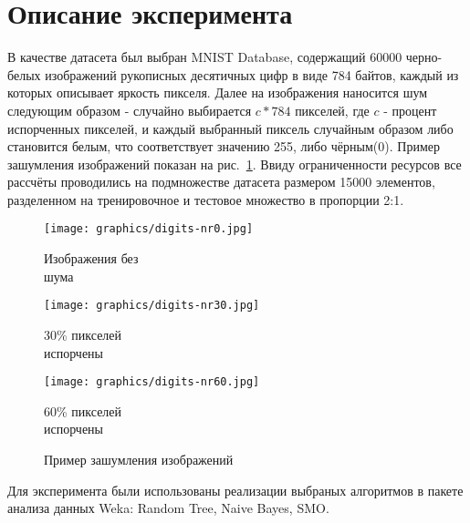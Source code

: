 \documentclass{article}
\begin{document}
\section{Описание эксперимента}
В качестве датасета был выбран MNIST Database\cite{quanpt:mnistlecun}, содержащий 60000 черно-белых изображений рукописных десятичных цифр в виде 784 байтов, каждый из которых описывает яркость пикселя. Далее на изображения наносится шум следующим образом - случайно выбирается $c * 784$ пикселей, где $c$ - процент испорченных пикселей, и каждый выбранный пиксель случайным образом либо становится белым, что соответствует значению 255, либо чёрным(0). Пример зашумления изображений показан на рис.~\ref{fig:noise}. Ввиду ограниченности ресурсов все рассчёты проводились на подмножестве датасета размером 15000 элементов, разделенном на тренировочное и тестовое множество в пропорции 2:1.

\begin{figure}[ht!b]
\centering
\begin{minipage}{.3\textwidth}
	\texttt{[image: graphics/digits-nr0.jpg]}
	\captionsetup{justification=centering}
	\caption*{Изображения без\\ шума}
\end{minipage}
\begin{minipage}{.3\textwidth}
	\texttt{[image: graphics/digits-nr30.jpg]}
	\captionsetup{justification=centering}
	\caption*{ 30\% пикселей\\ испорчены}
\end{minipage}
\begin{minipage}{.3\textwidth}
	\texttt{[image: graphics/digits-nr60.jpg]}
	\captionsetup{justification=centering}
	\caption*{ 60\% пикселей\\ испорчены}
\end{minipage}
\caption{Пример зашумления изображений}
\label{fig:noise}
\end{figure}
Для эксперимента были использованы реализации выбраных алгоритмов в пакете анализа данных Weka: Random Tree, Naive Bayes, SMO.
\end{document}
